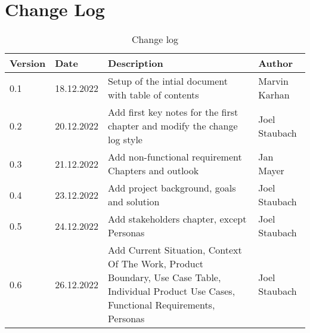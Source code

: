 \chapter{Change Log}

\sffamily
\begin{footnotesize}
  \renewcommand{\arraystretch}{1.4}
  \begin{longtable}[L L L L]{ p{} p{} p{} p{} }
    \caption                       %
    {Change log} %
    \\
    \toprule
    \textbf{Version} & \textbf{Date} & \textbf{Description}                                                                                                                          & \textbf{Author} \\
    \midrule
    0.1              & 18.12.2022    & Setup of the intial document with table of contents                                                                                           & Marvin Karhan   \\

    0.2              & 20.12.2022    & Add first key notes for the first chapter and modify the change log style                                                                     & Joel Staubach   \\

    0.3              & 21.12.2022    & Add non-functional requirement Chapters and outlook                                                                                           & Jan Mayer       \\

    0.4              & 23.12.2022    & Add project background, goals and solution                                                                                                    & Joel Staubach   \\

    0.5              & 24.12.2022    & Add stakeholders chapter, except Personas                                                                                                     & Joel Staubach   \\

    0.6              & 26.12.2022    & Add Current Situation, Context Of The Work, Product Boundary, Use Case Table, Individual Product Use Cases, Functional Requirements, Personas & Joel Staubach   \\


\end{longtable}
\end{footnotesize}
